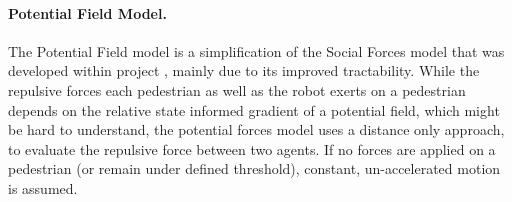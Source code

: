 \paragraph{Potential Field Model.} The Potential Field model is a simplification of the Social Forces model that was developed within project \project, mainly due to its improved tractability. While the repulsive forces each pedestrian as well as the robot exerts on a pedestrian depends on the relative state informed gradient of a potential field, which might be hard to understand, the potential forces model uses a distance only approach, to evaluate the repulsive force between two agents. If no forces are applied on a pedestrian (or remain under defined threshold), constant, un-accelerated motion is assumed.
 